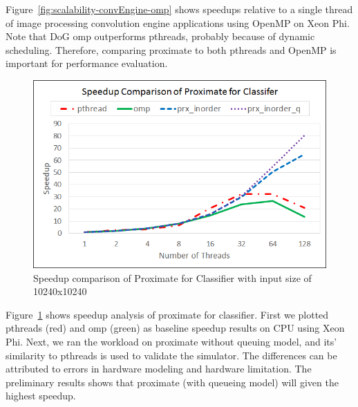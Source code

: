 Figure~\ref{fig:scalability-convEngine-omp} shows speedups relative to a single 
thread of image processing convolution engine applications using OpenMP on Xeon 
Phi. Note that DoG omp outperforms pthreads, probably because of dynamic 
scheduling. Therefore, comparing proximate to both pthreads and OpenMP is 
important for performance evaluation. 


\begin{figure}
  \begin{center}
    \includegraphics[width=\linewidth]{cs758-figs/speedup-classifier.png}
  \end{center}
\vspace{-0.2in}
  \caption{Speedup comparison of Proximate for Classifier with input size of 10240x10240}
  \label{fig:speedup-classifier}
\vspace{-0.05in}
\end{figure}


Figure~\ref{fig:speedup-classifier} shows speedup analysis of proximate for 
classifier. First we plotted pthreads (red) and omp (green) as baseline speedup 
results on CPU using Xeon Phi. Next, we ran the workload on proximate without 
queuing model, and its’ similarity to pthreads is used to validate the 
simulator. The differences can be attributed to errors in hardware modeling and 
hardware limitation. The preliminary results shows that proximate (with queueing 
model) will given the highest speedup. 

